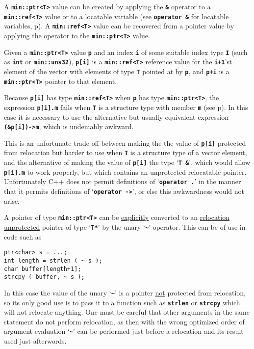 \documentclass[12pt]{article}
\newcommand{\TT}[1]{{\tt \bfseries #1}}
\newcommand{\pagref}[1]{p\pageref{#1}}
\newcommand{\EOL}{\penalty \exhyphenpenalty}
\newenvironment{indpar}[1][0.3in]%
	{\begin{list}{}%
		     {\setlength{\itemsep}{0in}%
		      \setlength{\topsep}{0in}%
		      \setlength{\parsep}{1ex}%
		      \setlength{\labelwidth}{#1}%
		      \setlength{\leftmargin}{#1}%
		      \addtolength{\leftmargin}{\labelsep}}%
	 \item}%
	{\end{list}}
\begin{document}
A \TT{min::\EOL ptr<T>} value can be created by applying the
\TT{\&} operator to a \TT{min::\EOL ref<T>} value or to a
locatable variable (see \TT{operator \&} for locatable variables,
\pagref{LOCATABLE_VAR_PTR}).
A \TT{min::\EOL ref<T>} value can be recovered from a
pointer value by applying the
\TT{*} operator to the \TT{min::\EOL ptr<T>} value.

Given a \TT{min::\EOL ptr<T>} value \TT{p} and an index \TT{i} of some
suitable index type \TT{I} (such as \TT{int} or \TT{min::\EOL uns32}),
\TT{p[i]} is a \TT{min::\EOL ref<T>}
reference value for the \TT{i+1}'st element of
the vector with elements of type \TT{T} pointed at by \TT{p}, and
\TT{p+i} is a \TT{min::\EOL ptr<T>} pointer to that element.

Because \TT{p[i]} has type \TT{min::\EOL ref<T>} when \TT{p} has
type \TT{min::\EOL ptr<T>}, the expression \TT{p[i].m} fails when
\TT{T} is a structure type with member \TT{m} (see \pagref{REF->}).
In this case it is
necessary to use the alternative but usually equivalent expression
\TT{(\&p[i])->m}, which is undeniably awkward.

This is an unfortunate trade off between making the
the value of \TT{p[i]} protected from relocation
but harder to use when \TT{T} is a structure type of a vector element,
and the alternative of making the value of \TT{p[i]}
the type `\TT{T \&}', which would allow \TT{p[i].m}
to work properly, but which contains an unprotected relocatable pointer.
Unfortunately C++ does not permit definitions of `\TT{operator .}' in
the manner that it permits definitions of `\TT{operator ->}', or else
this awkwardness would not arise.

A pointer of type \TT{min::ptr<T>} can be \underline{explicitly} converted
to an \underline{relocation unprotected}
pointer of type `\TT{T*}' by the unary `\TT{\textasciitilde}' operator.
This can be of use in code such as
\begin{indpar}\begin{verbatim}
ptr<char> s = ...;
int length = strlen ( ~ s );
char buffer[length+1];
strcpy ( buffer, ~ s );
\end{verbatim}\end{indpar}

In this case the value of the unary `\TT{\textasciitilde}'
is a pointer \underline{not}
protected from relocation, so its only good use is to pass it to a
function such as \TT{strlen} or \TT{strcpy} which will not relocate
anything.  One must be careful that other arguments in the same statement
do not perform relocation, as then with the wrong optimized
order of argument evaluation `\TT{\textasciitilde}'
can be performed just before a
relocation and its result used just afterwords.
\end{document}
